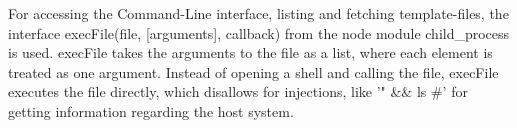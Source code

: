 For accessing the Command-Line interface, listing and fetching template-files, the interface execFile(file, [arguments], callback) from the node module child\_process is used.
execFile takes the arguments to the file as a list, where each element is treated as one argument.
Instead of opening a shell and calling the file, execFile executes the file directly, which disallows for injections, like '" \&\& ls \#' for getting information regarding the host system.

